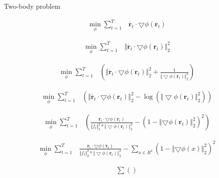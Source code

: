 \documentclass[11pt,letterpaper]{report}
\author{Brandon Houghton}
\begin{document}
Two-body problem

\begin{align}
\min_{\phi} \sum^{T}_{t = 1} & \dot{\pmb{r}_t} \cdot \bigtriangledown \phi \left( \pmb{r}_t \right)
\end{align}

\begin{align}
\min_{\phi} \sum^{T}_{t = 1} & \Vert \dot{\pmb{r}_t} \cdot \bigtriangledown \phi \left( \pmb{r}_t \right) \Vert^2_2
\end{align}

\begin{align}
\min_{\phi} \sum^{T}_{t = 1} & \left( \Vert \dot{\pmb{r}_t} \cdot \bigtriangledown \phi \left( \pmb{r}_t \right) \Vert^2_2 + \frac{1}{\Vert \bigtriangledown \phi \left( \pmb{r}_t \right) \Vert^2_2} \right)
\end{align}

\begin{align}
\min_{\phi} \sum^{T}_{t = 1} & \left( \Vert \dot{\pmb{r}_t} \cdot \bigtriangledown \phi \left( \pmb{r}_t \right) \Vert^2_2 -
\log{ \left( \Vert \bigtriangledown \phi \left( \pmb{r}_t \right) \Vert^2_2 \right)} \right)
\end{align}

\begin{align}
\min_{\phi} \sum^{T}_{t = 1} &  
\left(
	\frac{\dot{\pmb{r}_t} \cdot \bigtriangledown \phi \left( \pmb{r}_t \right)}{{\Vert f_t \Vert}^2_2 * {\Vert \bigtriangledown \phi (\pmb{r}_t) \Vert}^2_2}
 - \left( 1-\left\Vert \bigtriangledown \phi \left( \pmb{r}_t \right) \right\Vert^2_2 \right)^2 \right)
\end{align}

\begin{align}
\min_{\phi} \sum^{T}_{t = 1} &  
	\frac{\dot{\pmb{r}_t} \cdot \bigtriangledown \phi \left( \pmb{r}_t \right)}{{\Vert f_t \Vert}^2_2 * {\Vert \bigtriangledown \phi (\pmb{r}_t) \Vert}^2_2}
 -
\sum_{x \in R^4}\left( 1-\left\Vert \bigtriangledown \phi ( x ) \right\Vert^2_2 \right)^2
\end{align}

\begin{align}
\sum \left(  \right) \\
\end{align}
\end{document}
